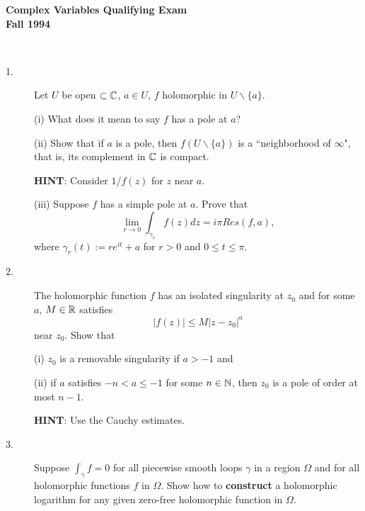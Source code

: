 \documentclass{article}
\begin{document}






\begin{center}\begin{LARGE}
{\bf Complex Variables Qualifying Exam}\\ 
{\bf Fall 1994}\\ \end{LARGE}
\end{center}
\vspace{0.1in}
\noindent\hrulefill\\

\begin{description}
\item[1.]
Let $U$ be open $\subset \Bbb C$,  $a \in U$, $f$ holomorphic in
$U \backslash \{a\}$.

\item[\quad] (i)
What does it mean to say $f$ has a pole at $a$?

\item[\quad] (ii)
Show that if $a$ is a pole, then $f(U \backslash \{a\})$ is a ``neighborhood
 of $\infty$", that is, its complement in $\Bbb C$ is compact.

{\bf HINT}: Consider $1/ f(z)$ for $z$ near $a$.

\item[\quad] (iii)
Suppose $f$ has a simple pole at $a$. Prove that
$$\lim_{r \to 0} \int_{\gamma_r} f(z) dz = i \pi Res (f,a),$$
where $\gamma_r (t) := re^{it} + a$ for $r>0$ and $0 \leq t \leq \pi$.

\item[2.]
The holomorphic function $f$ has an isolated singularity at $z_0$ and for
some $a$, $M \in \Bbb R$ satisfies
$$|f(z)| \leq M |z - z_0|^a$$
near $z_0$. Show that

\item[\quad] (i)
$z_0$ is a removable singularity if $a> -1$ and

\item[\quad] (ii)
if $a$ satisfies $-n < a \leq -1$ for some $n \in \Bbb N$, then $z_0$ is a
pole of order at most $n-1$.

{\bf HINT}: Use the Cauchy estimates.

\item[3.]
Suppose $\int_\gamma f=0$ for all piecewise smooth loops $\gamma$ in a region
$\Omega$ and for all holomorphic functions $f$ in $\Omega$. Show how to
{\bf construct} a holomorphic logarithm for any given zero-free holomorphic
function in $\Omega$.


\end{description}
\end{document}
